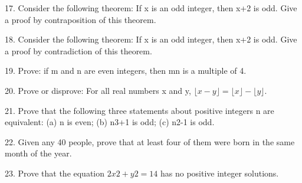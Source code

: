 \documentclass{article}
\begin{document}
17. Consider the following theorem: If x is an odd integer, then x+2 is odd. Give a proof by contraposition of this theorem.

18. Consider the following theorem: If x is an odd integer, then x+2 is odd. Give a proof by contradiction of this theorem.

19. Prove: if m and n are even integers, then mn is a multiple of 4.

20. Prove or disprove: For all real numbers x and y, $\lfloor x-y\rfloor =\lfloor x \rfloor -\lfloor y \rfloor$.

21. Prove that the following three statements about positive integers n are equivalent: (a) n is even; (b) n3+1 is odd; (c) n2-1 is odd.

22. Given any 40 people, prove that at least four of them were born in the same month of the year.

23. Prove that the equation $2x2+y2=14$ has no positive integer solutions.
\end{document}
